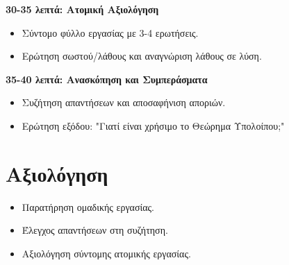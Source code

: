 \documentclass[a4paper,12pt]{article}
\begin{document}
\textbf{30-35 λεπτά: Ατομική Αξιολόγηση}
\begin{itemize}
  \item Σύντομο φύλλο εργασίας με 3-4 ερωτήσεις.
  \item Ερώτηση σωστού/λάθους και αναγνώριση λάθους σε λύση.
\end{itemize}

\textbf{35-40 λεπτά: Ανασκόπηση και Συμπεράσματα}
\begin{itemize}
  \item Συζήτηση απαντήσεων και αποσαφήνιση αποριών.
  \item Ερώτηση εξόδου: "Γιατί είναι χρήσιμο το Θεώρημα Υπολοίπου;"
\end{itemize}

\section*{Αξιολόγηση}
\begin{itemize}
  \item Παρατήρηση ομαδικής εργασίας.
  \item Έλεγχος απαντήσεων στη συζήτηση.
  \item Αξιολόγηση σύντομης ατομικής εργασίας.
\end{itemize}
\end{document}

